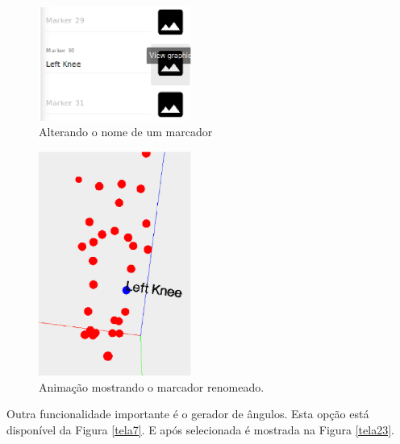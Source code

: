 \begin{figure}[ht]
	\centering
	\includegraphics[width=5cm]{figuras/tela21.eps}
	\caption{Alterando o nome de um marcador}
\label{tela21}
\end{figure}

\begin{figure}[ht]
	\centering
	\includegraphics[width=5cm]{figuras/tela22.eps}
	\caption{Animação mostrando o marcador renomeado.}
\label{tela22}
\end{figure}

Outra funcionalidade importante é o gerador de ângulos. Esta opção está disponível da Figura \ref{tela7}. E após selecionada é mostrada na Figura \ref{tela23}.
